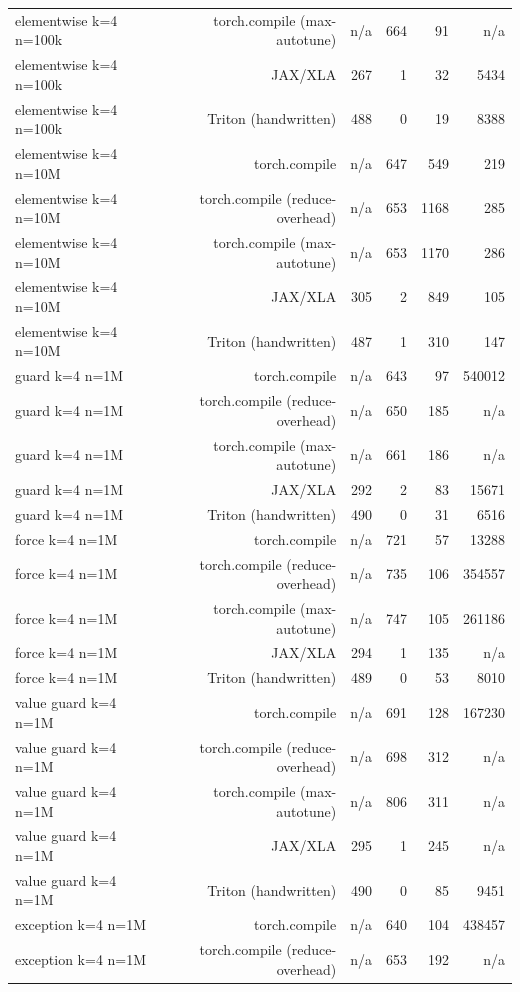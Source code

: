 \begin{tabular}{lrrrrr}
elementwise k=4 n=100k & torch.compile (max-autotune) & n/a & 664 & 91 & n/a \\
elementwise k=4 n=100k & JAX/XLA & 267 & 1 & 32 & 5434 \\
elementwise k=4 n=100k & Triton (handwritten) & 488 & 0 & 19 & 8388 \\
elementwise k=4 n=10M & torch.compile & n/a & 647 & 549 & 219 \\
elementwise k=4 n=10M & torch.compile (reduce-overhead) & n/a & 653 & 1168 & 285 \\
elementwise k=4 n=10M & torch.compile (max-autotune) & n/a & 653 & 1170 & 286 \\
elementwise k=4 n=10M & JAX/XLA & 305 & 2 & 849 & 105 \\
elementwise k=4 n=10M & Triton (handwritten) & 487 & 1 & 310 & 147 \\
guard k=4 n=1M & torch.compile & n/a & 643 & 97 & 540012 \\
guard k=4 n=1M & torch.compile (reduce-overhead) & n/a & 650 & 185 & n/a \\
guard k=4 n=1M & torch.compile (max-autotune) & n/a & 661 & 186 & n/a \\
guard k=4 n=1M & JAX/XLA & 292 & 2 & 83 & 15671 \\
guard k=4 n=1M & Triton (handwritten) & 490 & 0 & 31 & 6516 \\
force k=4 n=1M & torch.compile & n/a & 721 & 57 & 13288 \\
force k=4 n=1M & torch.compile (reduce-overhead) & n/a & 735 & 106 & 354557 \\
force k=4 n=1M & torch.compile (max-autotune) & n/a & 747 & 105 & 261186 \\
force k=4 n=1M & JAX/XLA & 294 & 1 & 135 & n/a \\
force k=4 n=1M & Triton (handwritten) & 489 & 0 & 53 & 8010 \\
value guard k=4 n=1M & torch.compile & n/a & 691 & 128 & 167230 \\
value guard k=4 n=1M & torch.compile (reduce-overhead) & n/a & 698 & 312 & n/a \\
value guard k=4 n=1M & torch.compile (max-autotune) & n/a & 806 & 311 & n/a \\
value guard k=4 n=1M & JAX/XLA & 295 & 1 & 245 & n/a \\
value guard k=4 n=1M & Triton (handwritten) & 490 & 0 & 85 & 9451 \\
exception k=4 n=1M & torch.compile & n/a & 640 & 104 & 438457 \\
exception k=4 n=1M & torch.compile (reduce-overhead) & n/a & 653 & 192 & n/a \\

\end{tabular}
